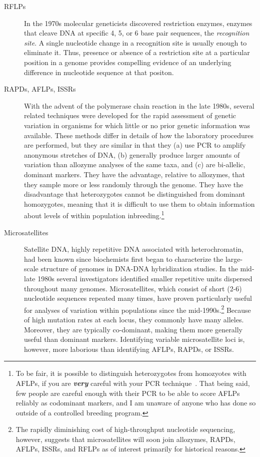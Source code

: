 \documentclass[12pt]{article}
\begin{document}
\begin{description}
\item[RFLPs] In the 1970s molecular geneticists discovered restriction
  enzymes, enzymes that cleave DNA at specific 4, 5, or 6 base pair
  sequences, the {\it recognition site}. A single nucleotide change in
  a recognition site is usually enough to eliminate it. Thus, presence
  or absence of a restriction site at a particular position in a
  genome provides compelling evidence of an underlying difference in
  nucleotide sequence at that positon.

\item[RAPDs, AFLPs, ISSRs] With the advent of the polymerase chain
  reaction in the late 1980s, several related techniques were
  developed for the rapid assessment of genetic variation in organisms
  for which little or no prior genetic information was
  available. These methods differ in details of how the laboratory
  procedures are performed, but they are similar in that they (a) use
  PCR to amplify anonymous stretches of DNA, (b) generally produce
  larger amounts of variation than allozyme analyses of the same taxa,
  and (c) are bi-allelic, dominant markers. They have the advantage,
  relative to allozymes, that they sample more or less randomly
  through the genome. They have the disadvantage that heterozygotes
  cannot be distinguished from dominant homozygotes, meaning that it
  is difficult to use them to obtain information about levels of
  within population inbreeding.\footnote{To be fair,
    it is possible to distinguish heterozygotes from homozyotes with
    AFLPs, if you are {\it\bf very\/} careful with your PCR
    technique~\cite{Jansen-etal-2001}. That being said, few people are
    careful enough with their PCR to be able to score AFLPs reliably
    as codominant markers, and I am unaware of anyone who has done so
    outside of a controlled breeding program.}

\item[Microsatellites] Satellite DNA, highly repetitive DNA associated
  with heterochromatin, had been known since biochemists first began
  to characterize the large-scale structure of genomes in DNA-DNA
  hybridization studies. In the mid-late 1980s several investigators
  identified smaller repetitive units dispersed throughout many
  genomes. Microsatellites, which consist of short (2-6) nucleotide
  sequences repeated many times, have proven particularly useful for
  analyses of variation within populations since the
  mid-1990s.\footnote{The rapidly diminishing cost of high-throughput
    nucleotide sequencing, however, suggests that microsatellites will
    soon join allozymes, RAPDs, AFLPs, ISSRs, and RFLPs as of interest
    primarily for historical reasons.} Because of high mutation rates
  at each locus, they commonly have many alleles. Moreover, they are
  typically co-dominant, making them more generally useful than
  dominant markers. Identifying variable microsatellite loci is,
  however, more laborious than identifying AFLPs, RAPDs, or ISSRs.


\end{description}
\end{document}
